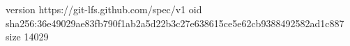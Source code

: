 version https://git-lfs.github.com/spec/v1
oid sha256:36e49029ae83fb790f1ab2a5d22b3c27e638615ce5e62cb9388492582ad1c887
size 14029
